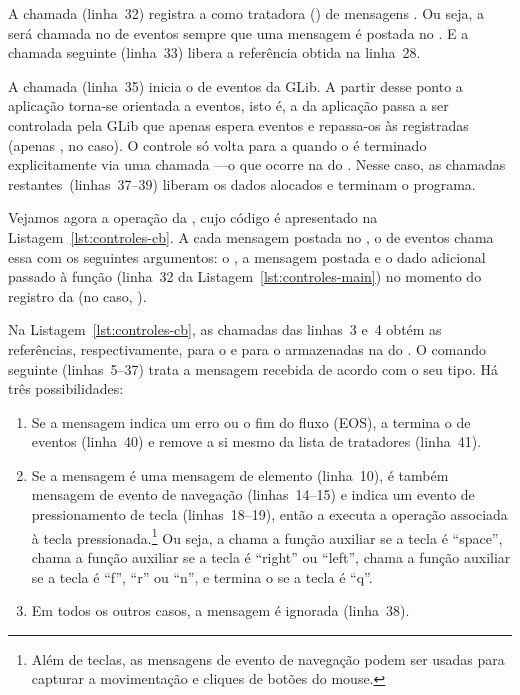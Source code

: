 \documentclass{SBCbookchapter}
\begin{document}
A chamada  (linha~32) registra a 
 como tratadora () de mensagens .  Ou seja, a
 será chamada no  de eventos sempre que uma mensagem é
postada no .  E a chamada seguinte (linha~33) libera a referência
obtida na linha~28.

A chamada  (linha~35) inicia o  de eventos da
GLib.  A partir desse ponto a aplicação torna-se orientada a eventos, isto
é, a  da aplicação passa a ser controlada pela GLib que apenas
espera eventos e repassa-os às  registradas (apenas
, no caso).  O controle só volta para a  quando o  é
terminado explicitamente via uma chamada ---o que ocorre
na  do .  Nesse caso, as chamadas
restantes~(linhas~37--39) liberam os dados alocados e terminam o programa.



Vejamos agora a operação da  , cujo código é apresentado
na Listagem~\ref{lst:controles-cb}.  A cada mensagem postada no , o
 de eventos chama essa  com os seguintes argumentos: o
, a mensagem postada e o dado adicional passado à função
 (linha~32 da Listagem~\ref{lst:controles-main}) no
momento do registro da  (no caso, ).

Na Listagem~\ref{lst:controles-cb}, as chamadas das linhas~3 e~4 obtém as
referências, respectivamente, para o  e para o 
armazenadas na  do .  O comando  seguinte
(linhas~5--37) trata a mensagem recebida de acordo com o seu tipo.  Há três
possibilidades:
\begin{enumerate}
\item Se a mensagem indica um erro ou o fim do fluxo (EOS), a 
  termina o  de eventos (linha~40) e remove a si mesmo da lista de
  tratadores (linha~41).
\item Se a mensagem é uma mensagem de elemento (linha~10), é também mensagem
  de evento de navegação (linhas~14--15) e indica um evento de
  pressionamento de tecla (linhas~18--19), então a  executa a
  operação associada à tecla pressionada.\footnote{Além de teclas, as
    mensagens de evento de navegação podem ser usadas para capturar a
    movimentação e cliques de botões do mouse.}  Ou seja, a 
  chama a função auxiliar  se a tecla é ``space'', chama a
  função auxiliar  se a tecla é ``right'' ou ``left'', chama a
  função auxiliar  se a tecla é ``f'', ``r'' ou ``n'', e termina o
   se a tecla é ``q''.
\item Em todos os outros casos, a mensagem é ignorada (linha~38).
\end{enumerate}
\end{document}
